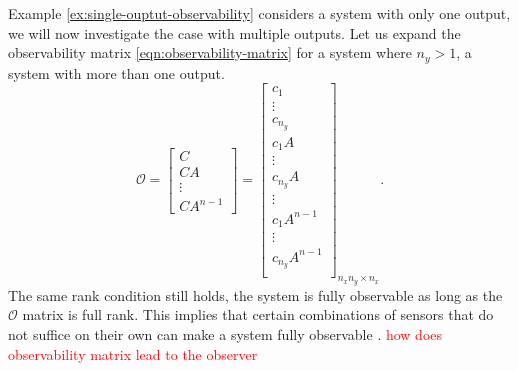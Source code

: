 Example \ref{ex:single-ouptut-observability} considers a system with only one output, we will now investigate the case with multiple outputs. Let us expand the observability matrix \eqref{eqn:observability-matrix} for a system where $n_y>1$, a system with more than one output.
\begin{equation*}
\mathcal{O}=
\begin{bmatrix}
    C \\
    CA \\
    \vdots \\
    CA^{n-1}
\end{bmatrix}    
=
\begin{bmatrix}
    c_1 \\
    \vdots \\
    c_{n_y} \\
    c_1A \\
    \vdots \\
    c_{n_y}A \\
    \vdots \\
    c_1A^{n-1}\\
    \vdots \\
    c_{n_y}A^{n-1} \\
\end{bmatrix}_{n_xn_y \times n_x}.
\end{equation*}
The same rank condition still holds, the system is fully observable as long as the $\mathcal{O}$ matrix is full rank. This implies that certain combinations of sensors that do not suffice on their own can make a system fully observable \cite[Section 3.4 D 2]{Antsaklis2006LinearSystems}.
\textcolor{red}{how does observability matrix lead to the observer}
